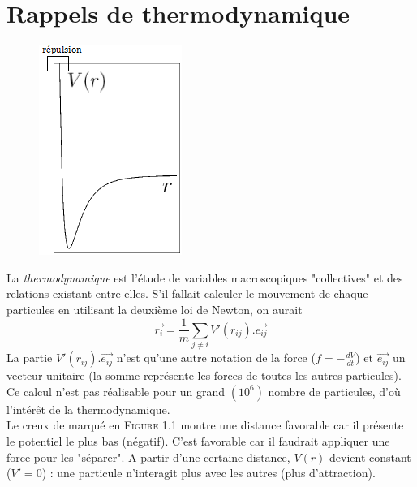 \documentclass[british,french,11pt, a4paper, openany]{book}
\begin{document}
	\section{Rappels de thermodynamique}
	\begin{figure}
		\includegraphics[scale=0.6]{cp/image1.png}
	\end{figure}
	La \textit{thermodynamique} est l'étude de variables macroscopiques "collectives" et des relations existant entre elles. S'il fallait calculer le mouvement de chaque particules en utilisant la deuxième loi de Newton, on aurait
	\begin{equation}
	\ddot{\vec{r_i}} = \frac{1}{m}\sum_{j\neq i} V'(r_{ij}).\vec{e_{ij}}
	\end{equation}
	La partie $V'(r_{ij}).\vec{e_{ij}}$ n'est qu'une autre notation de la force ($f = -\frac{dV}{dt}$) et $\vec{e_{ij}}$ un vecteur unitaire (la somme représente les forces de toutes les autres particules). Ce calcul n'est pas réalisable pour un grand $(10^6)$ nombre de particules, d'où l'intérêt de la thermodynamique.\\
	Le creux de marqué en \textsc{Figure 1.1} montre une distance favorable car il présente le potentiel le plus bas (négatif). C'est favorable car il faudrait appliquer une force pour les "séparer". A partir d'une certaine distance, $V(r)$ devient constant ($V' = 0$) : une particule n'interagit plus avec les autres (plus d'attraction).\\
	
\end{document}
